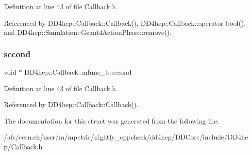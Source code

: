 Definition at line 43 of file Callback.\+h.



Referenced by D\+D4hep\+::\+Callback\+::\+Callback(), D\+D4hep\+::\+Callback\+::operator bool(), and D\+D4hep\+::\+Simulation\+::\+Geant4\+Action\+Phase\+::remove().

\hypertarget{struct_d_d4hep_1_1_callback_1_1mfunc__t_a510bbd3c9df48a5a950c9b7e4ea9eadc}{}\label{struct_d_d4hep_1_1_callback_1_1mfunc__t_a510bbd3c9df48a5a950c9b7e4ea9eadc} 
\subsubsection{\texorpdfstring{second}{second}}
{\footnotesize\ttfamily void $\ast$ D\+D4hep\+::\+Callback\+::mfunc\+\_\+t\+::second}



Definition at line 43 of file Callback.\+h.



Referenced by D\+D4hep\+::\+Callback\+::\+Callback().



The documentation for this struct was generated from the following file\+:\begin{DoxyCompactItemize}
\item 
/afs/cern.\+ch/user/m/mpetric/nightly\+\_\+cppcheck/dd4hep/\+D\+D\+Core/include/\+D\+D4hep/\hyperlink{_callback_8h}{Callback.\+h}\end{DoxyCompactItemize}

